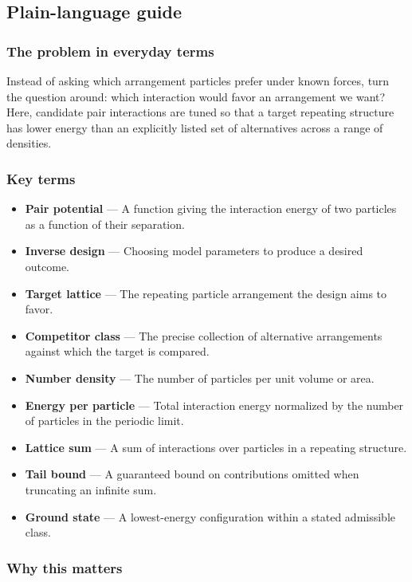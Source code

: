 \documentclass[
  11pt,
]{article}
\begin{document}
\subsection{Plain-language guide}

\subsubsection{The problem in everyday terms}

Instead of asking which arrangement particles prefer under known forces,
turn the question around: which interaction would favor an arrangement
we want? Here, candidate pair interactions are tuned so that a target
repeating structure has lower energy than an explicitly listed set of
alternatives across a range of densities.

\subsubsection{Key terms}

\begin{itemize}
\item
  \textbf{Pair potential} --- A function giving the interaction energy
  of two particles as a function of their separation.
\item
  \textbf{Inverse design} --- Choosing model parameters to produce a
  desired outcome.
\item
  \textbf{Target lattice} --- The repeating particle arrangement the
  design aims to favor.
\item
  \textbf{Competitor class} --- The precise collection of alternative
  arrangements against which the target is compared.
\item
  \textbf{Number density} --- The number of particles per unit volume or
  area.
\item
  \textbf{Energy per particle} --- Total interaction energy normalized
  by the number of particles in the periodic limit.
\item
  \textbf{Lattice sum} --- A sum of interactions over particles in a
  repeating structure.
\item
  \textbf{Tail bound} --- A guaranteed bound on contributions omitted
  when truncating an infinite sum.
\item
  \textbf{Ground state} --- A lowest-energy configuration within a
  stated admissible class.
\end{itemize}

\subsubsection{Why this matters}
\end{document}

